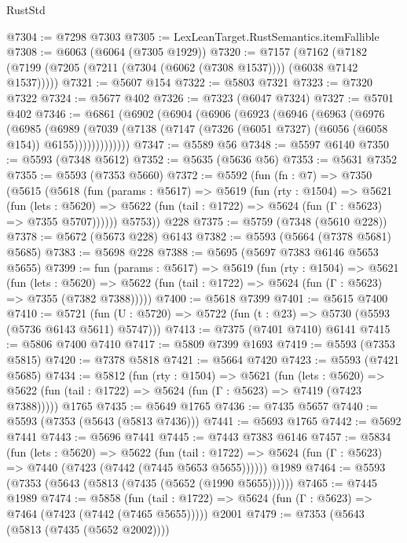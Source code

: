\begin{lexlean}{RustStd}
\begin{coremodule}
@7304 := @7298 @7303
@7305 := LexLeanTarget.RustSemantics.itemFallible
@7308 := @6063 (@6064 (@7305 @1929))
@7320 := @7157
    (@7162 (@7182 (@7199 (@7205 (@7211 (@7304 (@6062 (@7308 @1537)))) (@6038 @7142 @1537)))))
@7321 := @5607 @154
@7322 := @5803 @7321
@7323 := @7320 @7322
@7324 := @5677 @402
@7326 := @7323 (@6047 @7324)
@7327 := @5701 @402
@7346 := @6861
    (@6902
      (@6904
        (@6906
          (@6923
            (@6946
              (@6963
                (@6976
                  (@6985
                    (@6989
                      (@7039
                        (@7138 (@7147 (@7326 (@6051 @7327) (@6056 (@6058 @154)) @6155)))))))))))))
@7347 := @5589 @56
@7348 := @5597 @6140
@7350 := @5593 (@7348 @5612)
@7352 := @5635 (@5636 @56)
@7353 := @5631 @7352
@7355 := @5593 (@7353 @5660)
@7372 := @5592
    (fun (fn : @7) =>
    @7350
      (@5615
        (@5618
          (fun (params : @5617) =>
          @5619
            (fun (rty : @1504) =>
            @5621
              (fun (lets : @5620) =>
              @5622 (fun (tail : @1722) => @5624 (fun (Γ : @5623) => @7355 @5707))))))
        @5753))
    @228
@7375 := @5759 (@7348 (@5610 @228))
@7378 := @5672 (@5673 @228) @6143
@7382 := @5593 (@5664 (@7378 @5681) @5685)
@7383 := @5698 @228
@7388 := @5695 (@5697 @7383 @6146 @5653 @5655)
@7399 := fun (params : @5617) =>
  @5619
    (fun (rty : @1504) =>
    @5621
      (fun (lets : @5620) =>
      @5622 (fun (tail : @1722) => @5624 (fun (Γ : @5623) => @7355 (@7382 @7388)))))
@7400 := @5618 @7399
@7401 := @5615 @7400
@7410 := @5721 (fun (U : @5720) => @5722 (fun (t : @23) => @5730 (@5593 (@5736 @6143 @5611) @5747)))
@7413 := @7375 (@7401 @7410) @6141
@7415 := @5806 @7400 @7410
@7417 := @5809 @7399 @1693
@7419 := @5593 (@7353 @5815)
@7420 := @7378 @5818
@7421 := @5664 @7420
@7423 := @5593 (@7421 @5685)
@7434 := @5812
    (fun (rty : @1504) =>
    @5621
      (fun (lets : @5620) =>
      @5622 (fun (tail : @1722) => @5624 (fun (Γ : @5623) => @7419 (@7423 @7388)))))
    @1765
@7435 := @5649 @1765
@7436 := @7435 @5657
@7440 := @5593 (@7353 (@5643 (@5813 @7436)))
@7441 := @5693 @1765
@7442 := @5692 @7441
@7443 := @5696 @7441
@7445 := @7443 @7383 @6146
@7457 := @5834
    (fun (lets : @5620) =>
    @5622
      (fun (tail : @1722) => @5624 (fun (Γ : @5623) => @7440 (@7423 (@7442 (@7445 @5653 @5655))))))
    @1989
@7464 := @5593 (@7353 (@5643 (@5813 (@7435 (@5652 (@1990 @5655))))))
@7465 := @7445 @1989
@7474 := @5858
    (fun (tail : @1722) => @5624 (fun (Γ : @5623) => @7464 (@7423 (@7442 (@7465 @5655)))))
    @2001
@7479 := @7353 (@5643 (@5813 (@7435 (@5652 @2002))))

\end{coremodule}
\end{lexlean}

